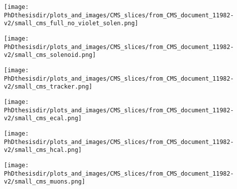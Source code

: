 \begin{frame}
\begin{center}
\texttt{[image: \\PhDthesisdir/plots\_and\_images/CMS\_slices/from\_CMS\_document\_11982-v2/small\_cms\_full\_no\_violet\_solen.png]}
\end{center}
\end{frame}

\begin{frame}
\addtocounter{framenumber}{-1}
\transdissolve
\begin{center}
\texttt{[image: \\PhDthesisdir/plots\_and\_images/CMS\_slices/from\_CMS\_document\_11982-v2/small\_cms\_solenoid.png]}
\end{center}
\end{frame}

\begin{frame}
\addtocounter{framenumber}{-1}
\transdissolve
\begin{center}
\texttt{[image: \\PhDthesisdir/plots\_and\_images/CMS\_slices/from\_CMS\_document\_11982-v2/small\_cms\_tracker.png]}
\end{center}
\end{frame}

\begin{frame}
\addtocounter{framenumber}{-1}
\transdissolve
\begin{center}
\texttt{[image: \\PhDthesisdir/plots\_and\_images/CMS\_slices/from\_CMS\_document\_11982-v2/small\_cms\_ecal.png]}
\end{center}
\end{frame}

\begin{frame}
\addtocounter{framenumber}{-1}
\transdissolve
\begin{center}
\texttt{[image: \\PhDthesisdir/plots\_and\_images/CMS\_slices/from\_CMS\_document\_11982-v2/small\_cms\_hcal.png]}
\end{center}
\end{frame}

\begin{frame}
\addtocounter{framenumber}{-1}
\transdissolve
\begin{center}
\texttt{[image: \\PhDthesisdir/plots\_and\_images/CMS\_slices/from\_CMS\_document\_11982-v2/small\_cms\_muons.png]}
\end{center}
\end{frame}